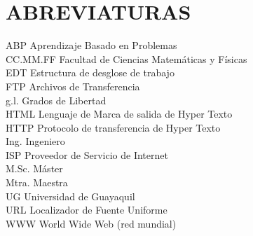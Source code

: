 \documentclass[12pt, a4paper, nofontenc, numbers=endperiod]{apa7}
\begin{document}
		{%
			\section*{\large \centering ABREVIATURAS}
			\begin{flushleft}
				\hspace*{2.5cm} ABP	\hspace{2.05cm} Aprendizaje Basado en Problemas\\ 	
				\hspace*{2.5cm}	CC.MM.FF 	\hspace{0.9cm} Facultad de Ciencias Matemáticas y Físicas\\
				\hspace*{2.5cm} EDT \hspace{2.1cm} Estructura de desglose de trabajo \\
				\hspace*{2.5cm} FTP \hspace*{2.15cm} Archivos de Transferencia\\ 
				\hspace*{2.5cm} g.l. \hspace*{2.4cm} Grados de Libertad\\ 
				\hspace*{2.5cm}	HTML\hspace{1.9cm} Lenguaje de Marca de salida de Hyper Texto\\ 
				\hspace*{2.5cm}	HTTP	\hspace{2cm} Protocolo de transferencia de Hyper Texto\\
				\hspace*{2.5cm}	Ing. 	\hspace{2.4cm} Ingeniero\\  
				\hspace*{2.5cm}	ISP 	\hspace{2.5cm} Proveedor de Servicio de Internet\\
				\hspace*{2.5cm}	M.Sc. 	\hspace{2.1cm} Máster\\  
				\hspace*{2.5cm}	Mtra. 	\hspace{2.2cm} Maestra\\ 
				\hspace*{2.5cm} UG	\hspace{2.5cm} Universidad de Guayaquil\\  
				\hspace*{2.5cm}	URL	\hspace{2.3cm} Localizador de Fuente Uniforme\\  
				\hspace*{2.5cm}	WWW \hspace{1.90cm} World Wide Web (red mundial) \\
				

\end{flushleft}}
\end{document}
